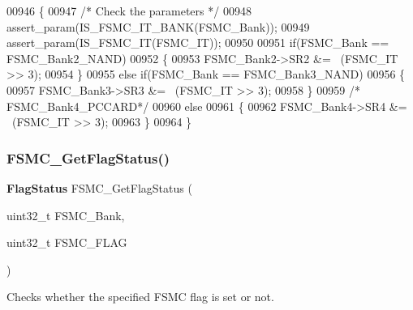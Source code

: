 \begin{DoxyCode}
00946 \{
00947   \textcolor{comment}{/* Check the parameters */}
00948   assert_param(IS_FSMC_IT_BANK(FSMC\_Bank));
00949   assert_param(IS_FSMC_IT(FSMC\_IT));
00950     
00951   \textcolor{keywordflow}{if}(FSMC\_Bank == FSMC_Bank2_NAND)
00952   \{
00953     FSMC_Bank2->SR2 &= ~(FSMC\_IT >> 3); 
00954   \}  
00955   \textcolor{keywordflow}{else} \textcolor{keywordflow}{if}(FSMC\_Bank == FSMC_Bank3_NAND)
00956   \{
00957     FSMC_Bank3->SR3 &= ~(FSMC\_IT >> 3);
00958   \}
00959   \textcolor{comment}{/* FSMC\_Bank4\_PCCARD*/}
00960   \textcolor{keywordflow}{else}
00961   \{
00962     FSMC_Bank4->SR4 &= ~(FSMC\_IT >> 3);
00963   \}
00964 \}
\end{DoxyCode}
\mbox{\label{group__FSMC__Group4_gae00355115b078f483f0771057bb849c4}} 
\subsubsection{F\+S\+M\+C\+\_\+\+Get\+Flag\+Status()}
{\footnotesize\ttfamily \textbf{ Flag\+Status} F\+S\+M\+C\+\_\+\+Get\+Flag\+Status (\begin{DoxyParamCaption}\item[{uint32\+\_\+t}]{F\+S\+M\+C\+\_\+\+Bank,  }\item[{uint32\+\_\+t}]{F\+S\+M\+C\+\_\+\+F\+L\+AG }\end{DoxyParamCaption})}



Checks whether the specified F\+S\+MC flag is set or not. 


